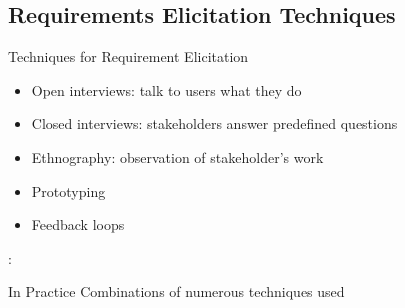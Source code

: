 \subsection{Requirements Elicitation Techniques}
\begin{frame}{\insertsubsection}
	\begin{fancycolumns}[keep]
		\begin{definition}{Techniques for Requirement Elicitation}
			\begin{itemize}
				\item Open interviews: talk to users what they do
				\item Closed interviews: stakeholders answer predefined questions
				\item Ethnography: observation of stakeholder's work
				\item Prototyping
				\item Feedback loops
			\end{itemize}
		\end{definition}
		\nextcolumn
		\begin{note}{\sommerville:}
		\end{note}
		\begin{example}{In Practice}
			Combinations of numerous techniques used
		\end{example}
	\end{fancycolumns}
\end{frame}

